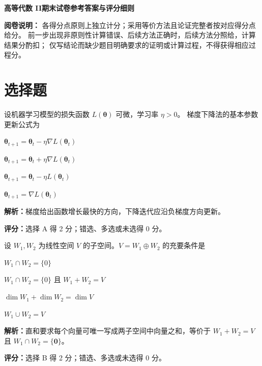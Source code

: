 \documentclass[10pt,a4paper]{exam-zh}
\newcommand{\bvec}[1]{\boldsymbol{#1}}
\newcommand{\shortgrading}[1]{%
  \par\smallskip\noindent\textcolor{gradingred}{\textbf{评分：}}#1\par}
\begin{document}
\begin{center}
{\LARGE \textbf{高等代数 II\quad 期末试卷参考答案与评分细则}}\\[0.4em]
\end{center}

\noindent\textbf{阅卷说明：}
各得分点原则上独立计分；采用等价方法且论证完整者按对应得分点给分。
前一步出现非原则性计算错误、后续方法正确时，后续方法分照给，计算结果分酌扣；
仅写结论而缺少题目明确要求的证明或计算过程，不得获得相应过程分。


\section{选择题}

\begin{question}
  设机器学习模型的损失函数 $L(\bvec{\theta})$ 可微，学习率 $\eta>0$。
  梯度下降法的基本参数更新公式为 \paren[A]
  \begin{choices}
    \item $\bvec{\theta}_{t+1}
      = \bvec{\theta}_t-\eta\nabla L(\bvec{\theta}_t)$
    \item $\bvec{\theta}_{t+1}
      = \bvec{\theta}_t+\eta\nabla L(\bvec{\theta}_t)$
    \item $\bvec{\theta}_{t+1}
      = \bvec{\theta}_t-\eta L(\bvec{\theta}_t)$
    \item $\bvec{\theta}_{t+1}
      = \nabla L(\bvec{\theta}_t)$
  \end{choices}
  \textbf{解析：}梯度给出函数增长最快的方向，下降迭代应沿负梯度方向更新。
  \shortgrading{选择 A 得 2 分；错选、多选或未选得 0 分。}
\end{question}

\begin{question}
  设 $W_1, W_2$ 为线性空间 $V$ 的子空间。$V = W_1 \oplus W_2$ 的充要条件是 \paren[B]
  \begin{choices}
    \item $W_1 \cap W_2 = \{0\}$
    \item $W_1 \cap W_2 = \{0\}$ 且 $W_1 + W_2 = V$
    \item $\dim W_1 + \dim W_2 = \dim V$
    \item $W_1 \cup W_2 = V$
  \end{choices}
  \textbf{解析：}直和要求每个向量可唯一写成两子空间中向量之和，等价于
  $W_1+W_2=V$ 且 $W_1\cap W_2=\{\bvec 0\}$。
  \shortgrading{选择 B 得 2 分；错选、多选或未选得 0 分。}
\end{question}
\end{document}

